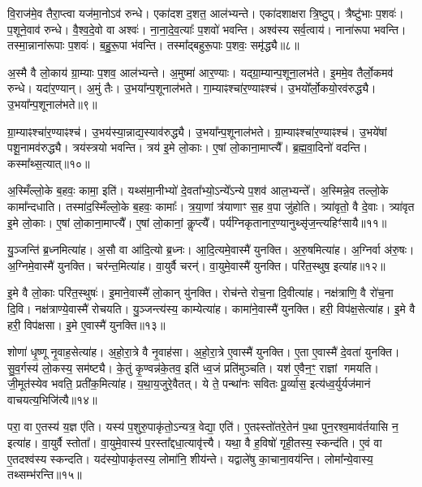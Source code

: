 वि॒राज॑मे॒व तैरा॒प्त्वा यज॑मा॒नो\-ऽव॑ रुन्धे।
एका॑दश द॒शत॒ आल॑भ्यन्ते।
एका॑दशाक्षरा त्रि॒ष्टुप्।
त्रैष्टु॑भाः प॒शवः॑।
प॒शूने॒वाव॑ रुन्धे।
वै॒श्व॒दे॒वो वा अश्वः॑।
ना॒ना॒दे॒व॒त्याः᳚ प॒शवो॑ भवन्ति।
अश्व॑स्य सर्व॒त्वाय॑।
नाना॑रूपा भवन्ति।
तस्मा॒न्नाना॑रूपाः प॒शवः॑।
ब॒हु॒रू॒पा भ॑वन्ति।
तस्मा᳚द्बहुरू॒पाः प॒शवः॒ समृ॑द्ध्यै॥८॥\anuvakamend[आ॒र॒ण्याँल्लो॒को द॒शिन॑ आल॒भ्यन्ते॒ नाना॑रूपाः प॒शवो॒ द्वे च॑]

अ॒स्मै वै लो॒काय॑ ग्रा॒म्याः प॒शव॒ आल॑भ्यन्ते।
अ॒मुष्मा॑ आर॒ण्याः।
यद्ग्रा॒म्यान्प॒शूना॒लभ॑ते।
इ॒ममे॒व तैर्लो॒कमव॑ रुन्धे।
यदा॑र॒ण्यान्।
अ॒मुं तैः।
उ॒भया᳚न्प॒शूनाल॑भते।
गा॒म्याꣴश्चा॑र॒ण्याꣴश्च॑।
उ॒भयो᳚र्लो॒कयो॒रव॑रुद्ध्यै।
उ॒भया᳚न्प॒शूना\-ल॑भते॥९॥

ग्रा॒म्याꣴश्चा॑र॒ण्याꣴश्च॑।
उ॒भय॑स्या॒न्नाद्य॒स्याव॑रुद्ध्यै।
उ॒भया᳚न्प॒शू\-नाल॑भते।
ग्रा॒म्याꣴश्चा॑र॒ण्याꣴश्च॑।
उ॒भये॑षां पशू॒नामव॑रुद्ध्यै।
त्रय॑स्त्रयो भवन्ति।
त्रय॑ इ॒मे लो॒काः।
ए॒षां लो॒काना॒माप्त्यै᳚।
ब्र॒ह्म॒वा॒दिनो॑ वदन्ति।
कस्मा᳚थ्स॒त्यात्॥१०॥

अ॒स्मिँल्लो॒के ब॒हवः॒ कामा॒ इति॑।
यथ्स॑मा॒नीभ्यो॑ दे॒वता᳚भ्यो॒\-ऽन्ये᳚\-ऽन्ये प॒शव॑ आल॒भ्यन्ते᳚।
अ॒स्मिन्ने॒व तल्लो॒के कामा᳚न्दधाति।
तस्मा॑द॒स्मिँल्लो॒के ब॒हवः॒ कामाः᳚।
त्र॒या॒णां त्र॑याणाꣳ स॒ह व॒पा जु॑होति।
त्र्या॑वृतो॒ वै दे॒वाः।
त्र्या॑वृत इ॒मे लो॒काः।
ए॒षां लो॒काना॒माप्त्यै᳚।
ए॒षां लो॒कानां॒ कॢप्त्यै᳚।
पर्य॑ग्निकृतानार॒ण्या\-नुथ्सृ॑ज॒न्त्यहिꣳ॑सायै॥११॥\anuvakamend[अव॑रुद्ध्या उ॒भया᳚न्प॒शूनाल॑भते स॒त्यादहिꣳ॑सायै]

यु॒ञ्जन्ति॑ ब्र॒ध्नमित्या॑ह।
अ॒सौ वा आ॑दि॒त्यो ब्र॒ध्नः।
आ॒दि॒त्यमे॒वास्मै॑ युनक्ति।
अ॒रु॒षमित्या॑ह।
अ॒ग्निर्वा अ॑रु॒षः।
अ॒ग्निमे॒वास्मै॑ युनक्ति।
चर॑न्त॒मित्या॑ह।
वा॒युर्वै चरन्॑।
वा॒युमे॒वास्मै॑ युनक्ति।
परि॑त॒स्थुष॒ इत्या॑ह॥१२॥

इ॒मे वै लो॒काः परि॑त॒स्थुषः॑।
इ॒माने॒वास्मै॑ लो॒कान् यु॑नक्ति।
रोच॑न्ते रोच॒ना दि॒वीत्या॑ह।
नक्ष॑त्राणि॒ वै रो॑च॒ना दि॒वि।
नक्ष॑त्राण्ये॒वास्मै॑ रोचयति।
यु॒ञ्जन्त्य॑स्य॒ काम्येत्या॑ह।
कामा॑ने॒वास्मै॑ युनक्ति।
हरी॒ विप॑क्ष॒सेत्या॑ह।
इ॒मे वै हरी॒ विप॑क्षसा।
इ॒मे ए॒वास्मै॑ युनक्ति॥१३॥

शोणा॑ धृ॒ष्णू नृ॒वाह॒सेत्या॑ह।
अ॒हो॒रा॒त्रे वै नृ॒वाह॑सा।
अ॒हो॒रा॒त्रे ए॒वास्मै॑ युनक्ति।
ए॒ता ए॒वास्मै॑ दे॒वता॑ युनक्ति।
सु॒व॒र्गस्य॑ लो॒कस्य॒ सम॑ष्ट्यै।
के॒तुं कृ॒ण्वन्न॑के॒तव॒ इति॑ ध्व॒जं प्रति॑\-मुञ्चति।
यश॑ ए॒वैन॒ꣳ॒ राज्ञां गमयति।
जी॒मूत॑स्येव भवति॒ प्रती॑क॒मित्या॑ह।
य॒था॒\-य॒जु\-रे॒वै\-तत्।
ये ते॒ पन्था॑नः सवितः पू॒र्व्यास॒ इत्य॑ध्व॒र्युर्यज॑मानं वाचयत्य॒भिजि॑त्यै॥१४॥

परा॒ वा ए॒तस्य॑ य॒ज्ञ ए॑ति।
यस्य॑ प॒शुरु॒पाकृ॑तो॒\-ऽन्यत्र॒ वेद्या॒ एति॑।
ए॒तꣴस्तो॑तरे॒तेन॑ प॒था पुन॒रश्व॒माव॑र्तयासि न॒ इत्या॑ह।
वा॒युर्वै स्तोता᳚।
वा॒युमे॒वास्य॑ प॒रस्ता᳚द्दधा॒त्यावृ॑त्त्यै।
यथा॒ वै ह॒विषो॑ गृही॒तस्य॒ स्कन्द॑ति।
ए॒वं वा ए॒तदश्व॑स्य स्कन्दति।
यद॑स्यो॒पाकृ॑तस्य॒ लोमा॑नि॒ शीय॑न्ते।
यद्वाले॑षु का॒चाना॒वय॑न्ति।
लोमा᳚न्ये॒वास्य॒ तथ्सम्भ॑रन्ति॥१५॥

